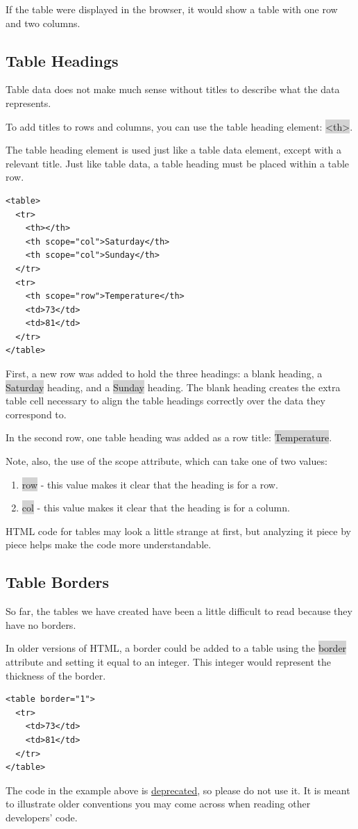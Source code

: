 \documentclass[11pt]{article}
\begin{document}
If the table were displayed in the browser, it would show a table with one row and two columns.

\subsection{Table Headings}
Table data does not make much sense without titles to describe what the data represents.

To add titles to rows and columns, you can use the table heading element: \colorbox{lightgray}{<th>}.

The table heading element is used just like a table data element, except with a relevant title. Just like table data, a table heading must be placed within a table row.
\begin{lstlisting}
<table>
  <tr>
    <th></th>
    <th scope="col">Saturday</th>
    <th scope="col">Sunday</th>
  </tr>
  <tr>
    <th scope="row">Temperature</th>
    <td>73</td>
    <td>81</td>
  </tr>
</table>
\end{lstlisting}

First, a new row was added to hold the three headings: a blank heading, a \colorbox{lightgray}{Saturday} heading, and a \colorbox{lightgray}{Sunday} heading. The blank heading creates the extra table cell necessary to align the table headings correctly over the data they correspond to.

In the second row, one table heading was added as a row title: \colorbox{lightgray}{Temperature}.

Note, also, the use of the scope attribute, which can take one of two values:
\begin{enumerate}[leftmargin = *]
\item \colorbox{lightgray}{row} - this value makes it clear that the heading is for a row.
\item \colorbox{lightgray}{col} - this value makes it clear that the heading is for a column.
\end{enumerate}
HTML code for tables may look a little strange at first, but analyzing it piece by piece helps make the code more understandable.

\subsection{Table Borders}
So far, the tables we have created have been a little difficult to read because they have no borders.

In older versions of HTML, a border could be added to a table using the \colorbox{lightgray}{border} attribute and setting it equal to an integer. This integer would represent the thickness of the border.
\begin{lstlisting}
<table border="1">
  <tr>
    <td>73</td>
    <td>81</td>
  </tr>
</table>
\end{lstlisting}
The code in the example above is \href{https://en.wikipedia.org/wiki/Deprecation}{deprecated}, so please do not use it. It is meant to illustrate older conventions you may come across when reading other developers’ code.
\end{document}
